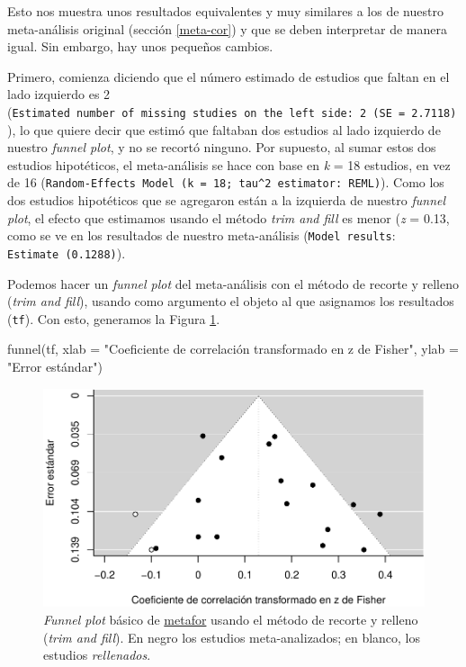 \documentclass[
  bookmarksnumbered]{article}
\newenvironment{Shaded}{\begin{snugshade}}{\end{snugshade}}
\newcommand{\AttributeTok}[1]{\textcolor[rgb]{0.00,0.34,0.68}{#1}}
\newcommand{\FunctionTok}[1]{\textcolor[rgb]{0.39,0.29,0.61}{#1}}
\newcommand{\NormalTok}[1]{\textcolor[rgb]{0.12,0.11,0.11}{#1}}
\newcommand{\StringTok}[1]{\textcolor[rgb]{0.75,0.01,0.01}{#1}}
\begin{document}
Esto nos muestra unos resultados equivalentes y muy similares a los de nuestro meta-análisis original (sección \ref{meta-cor}) y que se deben interpretar de manera igual. Sin embargo, hay unos pequeños cambios.

Primero, comienza diciendo que el número estimado de estudios que faltan en el lado izquierdo es 2 (\texttt{Estimated\ number\ of\ missing\ studies\ on\ the\ left\ side:\ 2\ (SE\ =\ 2.7118)}), lo que quiere decir que estimó que faltaban dos estudios al lado izquierdo de nuestro \emph{funnel plot}, y no se recortó ninguno. Por supuesto, al sumar estos dos estudios hipotéticos, el meta-análisis se hace con base en \emph{k} = 18 estudios, en vez de 16 (\texttt{Random-Effects\ Model\ (k\ =\ 18;\ tau\^{}2\ estimator:\ REML)}). Como los dos estudios hipotéticos que se agregaron están a la izquierda de nuestro \emph{funnel plot}, el efecto que estimamos usando el método \emph{trim and fill} es menor (\emph{z} = 0.13, como se ve en los resultados de nuestro meta-análisis (\texttt{Model\ results}: \texttt{Estimate\ (0.1288)}).

Podemos hacer un \emph{funnel plot} del meta-análisis con el método de recorte y relleno (\emph{trim and fill}), usando como argumento el objeto al que asignamos los resultados (\texttt{tf}). Con esto, generamos la Figura \ref{fig:tf-plot1}.

\begin{Shaded}
\begin{Highlighting}[]
\FunctionTok{funnel}\NormalTok{(tf, }
       \AttributeTok{xlab =} \StringTok{"Coeficiente de correlación transformado en z de Fisher"}\NormalTok{,}
       \AttributeTok{ylab =} \StringTok{"Error estándar"}\NormalTok{)}
\end{Highlighting}
\end{Shaded}

\begin{figure}
\centering
\includegraphics{Meta-analysis_files/figure-latex/tf-plot1-1.pdf}
\caption{\label{fig:tf-plot1}\emph{Funnel plot} básico de \href{https://www.metafor-project.org/doku.php}{metafor} usando el método de recorte y relleno (\emph{trim and fill}). En negro los estudios meta-analizados; en blanco, los estudios \emph{rellenados}.}
\end{figure}
\end{document}
